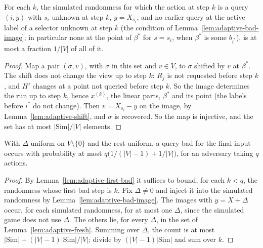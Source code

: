 \begin{lemma}
  \label{lem:adaptive-fresh}
  \leanok
  For each $k$, the simulated randomness for which the action at step $k$ is a query $(i, y)$ with
  $s_i$ unknown at step $k$, $y = X_{s_i}$, and no earlier query at the active label of a selector
  unknown at step $k$ (the condition of Lemma~\ref{lem:adaptive-bad-image}; in particular none at
  the point of $\beta^*$ for $s = s_i$, when $\beta^*$ is some $b_{i^*}$), is at most a fraction
  $1/|V|$ of all of it.
\end{lemma}

\begin{proof}
  \leanok
  Map a pair $(\sigma, v)$, with $\sigma$ in this set and $v \in V$, to $\sigma$ shifted by $v$ at
  $\beta^*$. The shift does not change the view up to step $k$: $R_j$ is not requested before step
  $k$, and $H'$ changes at a point not queried before step $k$. So the image determines the run up
  to step $k$, hence $x^{(k)}$, the linear parts, $\beta^*$ and its point (the labels before $i^*$
  do not change). Then $v = X_{s_i} - y$ on the image, by Lemma~\ref{lem:adaptive-shift}, and
  $\sigma$ is recovered. So the map is injective, and the set has at most $|\mathrm{Sim}| / |V|$
  elements.
\end{proof}

\begin{theorem}
  \label{thm:adaptive-bad-bound}
  \leanok
  With $\Delta$ uniform on $V \setminus \{0\}$ and the rest uniform, a query bad for the final input
  occurs with probability at most $q \bigl( 1/(|V| - 1) + 1/|V| \bigr)$, for an adversary taking
  $q$ actions.
\end{theorem}

\begin{proof}
  \leanok
  By Lemma~\ref{lem:adaptive-first-bad} it suffices to bound, for each $k < q$, the randomness whose
  first bad step is $k$. Fix $\Delta \neq 0$ and inject it into the simulated randomness by
  Lemma~\ref{lem:adaptive-bad-image}. The images with $y = X + \Delta$ occur, for each simulated
  randomness, for at most one $\Delta$, since the simulated game does not use $\Delta$. The others
  lie, for every $\Delta$, in the set of Lemma~\ref{lem:adaptive-fresh}. Summing over $\Delta$, the
  count is at most $|\mathrm{Sim}| + (|V| - 1)|\mathrm{Sim}|/|V|$; divide by $(|V| - 1)
  |\mathrm{Sim}|$ and sum over $k$.
\end{proof}

